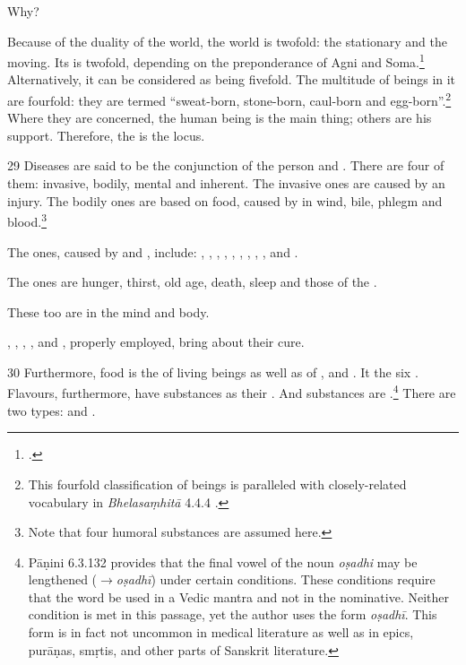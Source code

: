 \documentclass[12pt]{article}
\begin{document}
\begin{translation}
        Why?
        
        Because of the duality of the world, the world is twofold: the stationary
and the moving. Its  is twofold, depending on the
preponderance of Agni and Soma.\footcite[See][]{wuja-2004}  Alternatively,
it can be considered as being fivefold.  The multitude of beings in it are
fourfold: they are termed “sweat-born, stone-born, caul-born and
egg-born”.\footnote{This fourfold classification of beings is paralleled
with closely-related vocabulary in  \emph{Bhelasaṃhitā} 4.4.4	
\parencites[206]{kris-2000}[81]{mook-1921}.}  Where they are concerned, the
human being is the main thing; others are his support.  Therefore, the
 is the locus.

\item[29]  Diseases are said to be the conjunction of the person and 
.
 There are four of them: invasive, bodily, mental and inherent.  The invasive ones 
 are caused by an injury.  The bodily ones are based on food, caused by 
  in wind, bile, phlegm and blood.\footnote{Note 
 that four humoral substances are assumed here.} 
 
The  ones, caused by 
 and 
, 
include:  
, 
, 
, 
, 
 , 
 ,
 ,
 ,
 , 
 and
 .
 
 The  ones are hunger, thirst, old age, death, 
 sleep and  those of the .
 
 These too are  in the mind and body.
 
,
,
,
 ,
  and
 , 
 properly employed, bring about their cure.
    
 
 \item [30] Furthermore, food is the   of living beings as well
as of ,  and 
. It  the six .
Flavours, furthermore, have substances as their .  And
substances are .\footnote{Pāṇini 6.3.132 provides that
the final vowel of the noun \emph{oṣadhi} may be lengthened
(\emph{$\rightarrow$oṣadhī}) under certain conditions.  These conditions require
that the word be used in a Vedic mantra and not in the nominative.  Neither
condition is met in this passage, yet the author uses the form \emph{oṣadhī}. 
This form is in fact not uncommon in medical literature as well as in epics,
purāṇas, smṛtis, and other parts of Sanskrit literature.} There are 
two types:
 and .




\end{translation}
\end{document}
